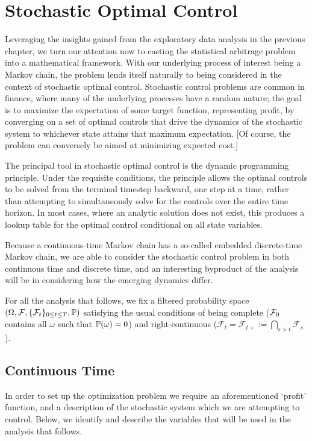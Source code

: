 \chapter{Stochastic Optimal Control}
Leveraging the insights gained from the exploratory data analysis in the previous chapter, we turn our attention now to casting the statistical arbitrage problem into a mathematical framework. With our underlying process of interest being a Markov chain, the problem lends itself naturally to being considered in the context of stochastic optimal control. Stochastic control problems are common in finance, where many of the underlying processes have a random nature; the goal is to maximize the expectation of some target function, representing profit, by converging on a set of optimal controls that drive the dynamics of the stochastic system to whichever state attains that maximum expectation. [Of course, the problem can conversely be aimed at minimizing expected cost.]

The principal tool in stochastic optimal control is the dynamic programming principle. Under the requisite conditions, the principle allows the optimal controls to be solved from the terminal timestep backward, one step at a time, rather than attempting to simultaneously solve for the controls over the entire time horizon. In most cases, where an analytic solution does not exist, this produces a lookup table for the optimal control conditional on all state variables. 

Because a continuous-time Markov chain has a so-called embedded discrete-time Markov chain, we are able to consider the stochastic control problem in both continuous time and discrete time, and an interesting byproduct of the analysis will be in considering how the emerging dynamics differ.

For all the analysis that follows, we fix a filtered probability space $( \Omega, \cF, \{ \cF_t \}_{0 \leq t \leq T}, \P )$ satisfying the usual conditions of being complete ($\cF_0$ contains all $\omega$ such that $\P(\omega) = 0$) and right-continuous ($\mathcal{F}_t = \mathcal{F}_{t+} := \bigcap_{s > t} \mathcal{F}_s$).

\section{Continuous Time}
In order to set up the optimization problem we require an aforementioned `profit' function, and a description of the stochastic system which we are attempting to control. Below, we identify and describe the variables that will be used in the analysis that follows.

